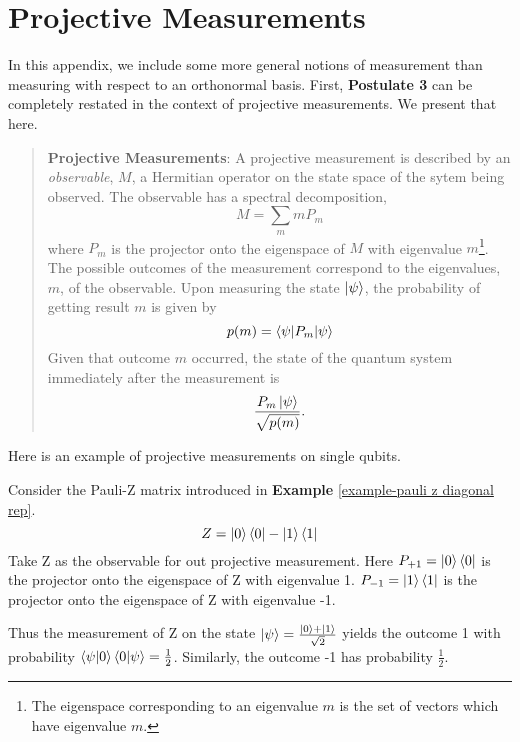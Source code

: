
\chapter{Projective Measurements} %

\label{AppendixA} %
In this appendix, we include some more general notions of measurement than measuring with respect to an orthonormal basis.  First, {\bf{Postulate 3}} can be completely restated in the context of projective measurements.  We present that here.
\begin{quote}
    \textbf{Projective Measurements}: A projective measurement is described by an \textit{observable}, $M$, a Hermitian operator on the state space of the sytem being observed. The observable has a spectral decomposition,
    \begin{equation}
        M=\sum_m m P_m
    \end{equation}
    where $P_m$ is the projector onto the eigenspace of $M$ with eigenvalue $m$\footnote{The eigenspace corresponding to an eigenvalue $m$ is the set of vectors which have eigenvalue $m$.}. The possible outcomes of the measurement correspond to the eigenvalues, $m$, of the observable. Upon measuring the state $\ket{\psi}$, the probability of getting result $m$ is given by 
    \begin{equation} \label{eqn: projective measurement}
        p(m)=\braket{\psi|P_m|\psi}
    \end{equation}
    Given that outcome $m$ occurred, the state of the quantum system immediately after the measurement is 
    \begin{equation}
        \frac{P_m \ket{\psi}}{\sqrt{p(m)}}.
    \end{equation}
\end{quote}

Here is an example of projective measurements on single qubits.
\begin{example}
Consider the Pauli-Z matrix introduced in \textbf{Example} \ref{example-pauli z diagonal rep}.
\begin{equation}
    Z=\ket{0}\bra{0}-\ket{1}\bra{1}
\end{equation}
Take Z as the observable for out projective measurement. Here $P_{+1}=\ket{0}\bra{0}$ is the projector onto the eigenspace of Z with eigenvalue 1. $P_{-1}=\ket{1}\bra{1}$ is the projector onto the eigenspace of Z with eigenvalue -1.

Thus the measurement of Z on the state $\ket{\psi}=\frac{\ket{0}+\ket{1}}{\sqrt{2}}$ yields the outcome 1 with probability $\braket{\psi|0}\braket{0|\psi}=\frac{1}{2}$. Similarly, the outcome -1 has probability $\frac{1}{2}$.
\end{example}

